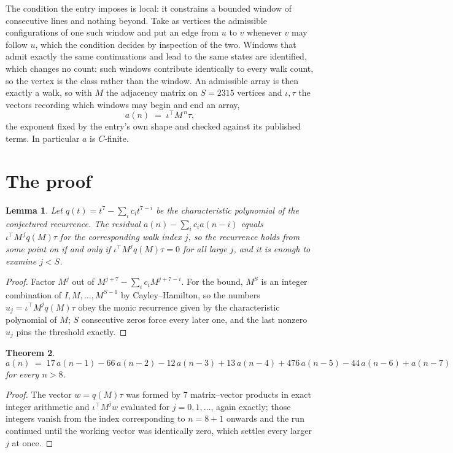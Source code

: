\documentclass[11pt,a4paper]{article}
\theoremstyle{plain}
\newtheorem{theorem}{Theorem}
\newtheorem{lemma}[theorem]{Lemma}
\theoremstyle{definition}
\begin{document}
The condition the entry imposes is local: it constrains a bounded window of consecutive lines and nothing beyond. Take as
vertices the admissible configurations of one such window and put an edge from $u$ to $v$
whenever $v$ may follow $u$, which the condition decides by inspection of the two. Windows that admit exactly the same continuations and lead to the same states are identified, which changes no count: such windows contribute identically to every walk count, so the vertex is the class rather than the window. An
admissible array is then exactly a walk, so with $M$ the adjacency matrix on $S=2315$ vertices
and $\iota,\tau$ the vectors recording which windows may begin and end an array,
\[
a(n)\;=\;\iota^{\!\top}M^{\,n}\tau ,
\]
the exponent fixed by the entry's own shape and checked against its published terms. In
particular $a$ is $C$-finite.

\section{The proof}

\begin{lemma}\label{lem:crit}
Let $q(t)=t^{7}-\sum_i c_it^{7-i}$ be the characteristic polynomial of the
conjectured recurrence. The residual $a(n)-\sum_ic_ia(n-i)$ equals
$\iota^{\!\top}M^{\,j}q(M)\tau$ for the corresponding walk index $j$, so the recurrence
holds from some point on if and only if $\iota^{\!\top}M^{j}q(M)\tau=0$ for all large $j$,
and it is enough to examine $j<S$.
\end{lemma}

\begin{proof}
Factor $M^{j}$ out of $M^{j+7}-\sum_ic_iM^{j+7-i}$. For the bound, $M^{S}$
is an integer combination of $I,M,\dots,M^{S-1}$ by Cayley--Hamilton, so the numbers
$u_j=\iota^{\!\top}M^{j}q(M)\tau$ obey the monic recurrence given by the characteristic
polynomial of $M$; $S$ consecutive zeros force every later one, and the last nonzero $u_j$
pins the threshold exactly.
\end{proof}

\begin{theorem}
\[
a(n)\;=\;17\,a(n-1) - 66\,a(n-2) - 12\,a(n-3) + 13\,a(n-4) + 476\,a(n-5) - 44\,a(n-6) + a(n-7)
\]
for every $n>8$.
\end{theorem}

\begin{proof}
The vector $w=q(M)\tau$ was formed by $7$ matrix--vector products in exact integer
arithmetic and $\iota^{\!\top}M^{j}w$ evaluated for $j=0,1,\dots$, again exactly; those
integers vanish from the index corresponding to $n=8+1$ onwards and the run continued
until the working vector was identically zero, which settles every larger $j$ at once.
\end{proof}
\end{document}
